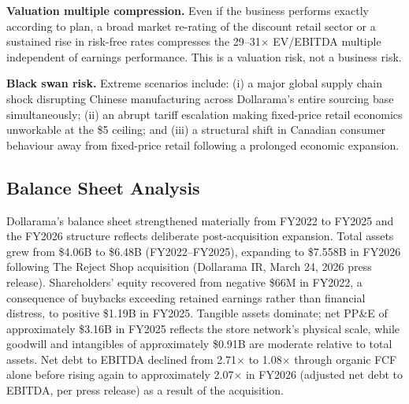 \documentclass[11pt]{article}
\begin{document}
\textbf{Valuation multiple compression.} Even if the business performs exactly according to plan, a broad market re-rating of the discount retail sector or a sustained rise in risk-free rates compresses the 29--31$\times$ EV/EBITDA multiple independent of earnings performance. This is a valuation risk, not a business risk.

\textbf{Black swan risk.} Extreme scenarios include: (i) a major global supply chain shock disrupting Chinese manufacturing across Dollarama's entire sourcing base simultaneously; (ii) an abrupt tariff escalation making fixed-price retail economics unworkable at the \$5 ceiling; and (iii) a structural shift in Canadian consumer behaviour away from fixed-price retail following a prolonged economic expansion.

\subsection{Balance Sheet Analysis}
Dollarama's balance sheet strengthened materially from FY2022 to FY2025 and the FY2026 structure reflects deliberate post-acquisition expansion. Total assets grew from \$4.06B to \$6.48B (FY2022--FY2025), expanding to \$7.558B in FY2026 following The Reject Shop acquisition (Dollarama IR, March 24, 2026 press release). Shareholders' equity recovered from negative \$66M in FY2022, a consequence of buybacks exceeding retained earnings rather than financial distress, to positive \$1.19B in FY2025. Tangible assets dominate; net PP\&E of approximately \$3.16B in FY2025 reflects the store network's physical scale, while goodwill and intangibles of approximately \$0.91B are moderate relative to total assets. Net debt to EBITDA declined from 2.71$\times$ to 1.08$\times$ through organic FCF alone before rising again to approximately 2.07$\times$ in FY2026 (adjusted net debt to EBITDA, per press release) as a result of the acquisition.
\end{document}
